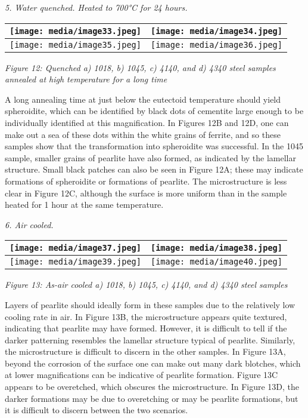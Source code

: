 \documentclass[]{article}
\begin{document}
\emph{5. Water quenched. Heated to 700°C for 24 hours.}

\begin{longtable}[]{@{}ll@{}}
\toprule
\texttt{[image: media/image33.jpeg]} &
\texttt{[image: media/image34.jpeg]}\tabularnewline
\midrule
\endhead
\texttt{[image: media/image35.jpeg]} &
\texttt{[image: media/image36.jpeg]}\tabularnewline
\bottomrule
\end{longtable}

\emph{Figure 12: Quenched a) 1018, b) 1045, c) 4140, and d) 4340 steel
samples annealed at high temperature for a long time}

A long annealing time at just below the eutectoid temperature should
yield spheroidite, which can be identified by black dots of cementite
large enough to be individually identified at this magnification. In
Figures 12B and 12D, one can make out a sea of these dots within the
white grains of ferrite, and so these samples show that the
transformation into spheroidite was successful. In the 1045 sample,
smaller grains of pearlite have also formed, as indicated by the
lamellar structure. Small black patches can also be seen in Figure 12A;
these may indicate formations of spheroidite or formations of pearlite.
The microstructure is less clear in Figure 12C, although the surface is
more uniform than in the sample heated for 1 hour at the same
temperature.

\emph{6. Air cooled.}

\begin{longtable}[]{@{}ll@{}}
\toprule
\texttt{[image: media/image37.jpeg]} &
\texttt{[image: media/image38.jpeg]}\tabularnewline
\midrule
\endhead
\texttt{[image: media/image39.jpeg]} &
\texttt{[image: media/image40.jpeg]}\tabularnewline
\bottomrule
\end{longtable}

\emph{Figure 13: As-air cooled a) 1018, b) 1045, c) 4140, and d) 4340
steel samples}

Layers of pearlite should ideally form in these samples due to the
relatively low cooling rate in air. In Figure 13B, the microstructure
appears quite textured, indicating that pearlite may have formed.
However, it is difficult to tell if the darker patterning resembles the
lamellar structure typical of pearlite. Similarly, the microstructure is
difficult to discern in the other samples. In Figure 13A, beyond the
corrosion of the surface one can make out many dark blotches, which at
lower magnifications can be indicative of pearlite formation. Figure 13C
appears to be overetched, which obscures the microstructure. In Figure
13D, the darker formations may be due to overetching or may be pearlite
formations, but it is difficult to discern between the two scenarios.
\end{document}
